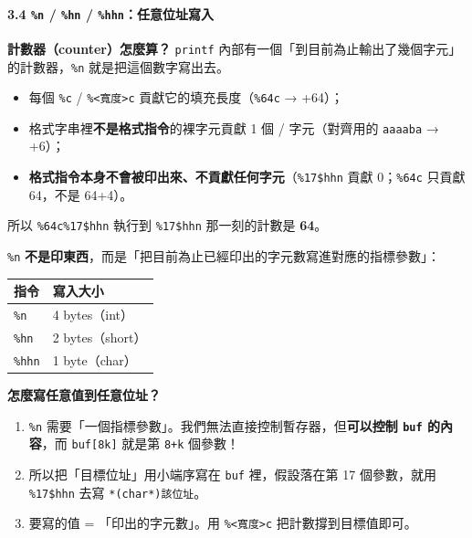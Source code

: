 \documentclass[10pt,a4paper]{article}
\newcounter{none}
\providecommand{\tightlist}{%
  \setlength{\itemsep}{0pt}\setlength{\parskip}{0pt}}
\begin{document}
\paragraph{\texorpdfstring{3.4 \texttt{\%\allowbreak{}n} / \texttt{\%\allowbreak{}hn} /
\texttt{\%\allowbreak{}hhn}：任意位址寫入}{3.4 \%n / \%hn / \%hhn：任意位址寫入}}\label{n-hn-hhnux4efbux610fux4f4dux5740ux5bebux5165}

\textbf{計數器（counter）怎麼算？} \texttt{printf}
內部有一個「到目前為止輸出了幾個字元」的計數器，\texttt{\%\allowbreak{}n}
就是把這個數字寫出去。

\begin{itemize}
\tightlist
\item
  每個 \texttt{\%\allowbreak{}c} / \texttt{\%\allowbreak{}\textless{}\allowbreak{}寬度\textgreater{}\allowbreak{}c}
  貢獻它的填充長度（\texttt{\%\allowbreak{}64c} → +64）；
\item
  格式字串裡\textbf{不是格式指令}的裸字元貢獻 1 個 / 字元（對齊用的
  \texttt{aaaaba} → +6）；
\item
  \textbf{格式指令本身不會被印出來、不貢獻任何字元}（\texttt{\%\allowbreak{}17\$\allowbreak{}hhn}
  貢獻 0；\texttt{\%\allowbreak{}64c} 只貢獻 64，不是 64+4）。
\end{itemize}

所以 \texttt{\%\allowbreak{}64c\%\allowbreak{}17\$\allowbreak{}hhn} 執行到 \texttt{\%\allowbreak{}17\$\allowbreak{}hhn} 那一刻的計數是
\textbf{64}。

\texttt{\%\allowbreak{}n}
\textbf{不是印東西}，而是「把目前為止已經印出的字元數寫進對應的指標參數」：

{\def\LTcaptype{none} %
\begin{longtable}[]{@{}ll@{}}
\toprule\noalign{}
指令 & 寫入大小 \\
\midrule\noalign{}
\endhead
\bottomrule\noalign{}
\endlastfoot
\texttt{\%\allowbreak{}n} & 4 bytes（int） \\
\texttt{\%\allowbreak{}hn} & 2 bytes（short） \\
\texttt{\%\allowbreak{}hhn} & 1 byte（char） \\
\end{longtable}
}

\textbf{怎麼寫任意值到任意位址？}

\begin{enumerate}
\def\labelenumi{\arabic{enumi}.}
\tightlist
\item
  \texttt{\%\allowbreak{}n}
  需要「一個指標參數」。我們無法直接控制暫存器，但\textbf{可以控制
  \texttt{buf} 的內容}，而 \texttt{buf{[}8k{]}} 就是第 \texttt{8+k}
  個參數！
\item
  所以把「目標位址」用小端序寫在 \texttt{buf} 裡，假設落在第 17
  個參數，就用 \texttt{\%\allowbreak{}17\$\allowbreak{}hhn} 去寫 \texttt{*(char*)該位址}。
\item
  要寫的值 = 「印出的字元數」。用
  \texttt{\%\allowbreak{}\textless{}\allowbreak{}寬度\textgreater{}\allowbreak{}c} 把計數撐到目標值即可。
\end{enumerate}
\end{document}
